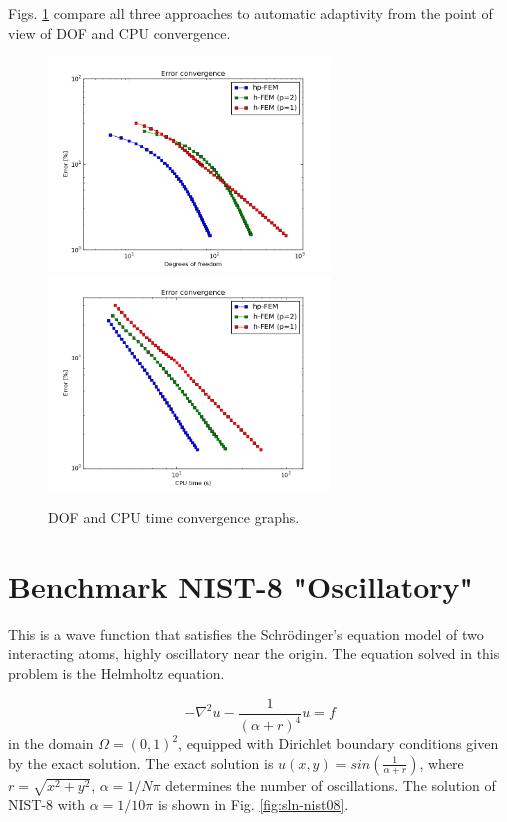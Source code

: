 \documentclass[12pt]{elsarticle}
\begin{document}
Figs. \ref{fig:nist-7-conv} compare all
three approaches to automatic adaptivity from the point
of view of DOF and CPU convergence.
\vspace{-3mm}

\begin{figure}[H]
\centering
\hspace{-50mm}
\includegraphics[width=7.5cm]{nist/nist-7/conv_dof_aniso.png}\ \
\hspace{-10mm}
\includegraphics[width=7.5cm]{nist/nist-7/conv_cpu_aniso.png}
\hspace{-50mm}
\caption{DOF and CPU time convergence graphs.}
\label{fig:nist-7-conv}
\vspace{-3mm}
\end{figure}


\section{Benchmark NIST-8 "Oscillatory"}
\label{sec:bench-8}

This is a wave function that satisfies the Schr\"{o}dinger's equation model of two
interacting atoms, highly oscillatory near the origin.
The equation solved in this problem is the Helmholtz equation.

\begin{equation} \label{oscillatory}
-\nabla^{2} u - \frac{1}{(\alpha + r)^{4}} u = f
\end{equation}
in the domain $\Omega = (0, 1)^2$, equipped with Dirichlet boundary conditions
given by the exact solution. The exact solution is
$u(x,y) = sin(\frac{1}{\alpha + r})$,
where $r = \sqrt{x^{2} + y^{2}}$, $\alpha = 1 / N \pi$ determines the number of oscillations.
The solution of NIST-8 with $\alpha = 1 / 10 \pi$ is shown in Fig. \ref{fig:sln-nist08}.
\end{document}
